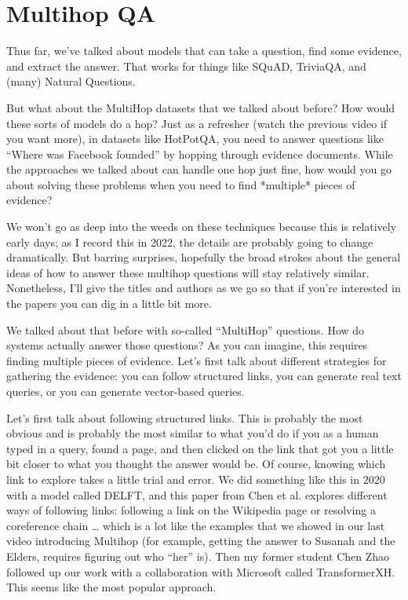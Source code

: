 \label{chapter:formats}


\section{Multihop QA}
\label{sec:formats:multihop}

Thus far, we’ve talked about models that can take a question, find some evidence, and extract the answer.  That works for things like SQuAD, TriviaQA, and (many) Natural Questions.  

But what about the MultiHop datasets that we talked about before?  How would these sorts of models do a hop?  Just as a refresher (watch the previous video if you want more), in datasets like HotPotQA, you need to answer questions like “Where was Facebook founded” by hopping through evidence documents.  While the approaches we talked about can handle one hop just fine, how would you go about solving these problems when you need to find *multiple* pieces of evidence?

We won’t go as deep into the weeds on these techniques because this is relatively early days; as I record this in 2022, the details are probably going to change dramatically.  But barring surprises, hopefully the broad strokes about the general ideas of how to answer these multihop questions will stay relatively similar.  Nonetheless, I’ll give the titles and authors as we go so that if you’re interested in the papers you can dig in a little bit more.

We talked about that before with so-called “MultiHop” questions.  How do systems actually answer those questions?  As you can imagine, this requires finding multiple pieces of evidence.  Let’s first talk about different strategies for gathering the evidence: you can follow structured links, you can generate real text queries, or you can generate vector-based queries.

Let’s first talk about following structured links.  This is probably the most obvious and is probably the most similar to what you’d do if you as a human typed in a query, found a page, and then clicked on the link that got you a little bit closer to what you thought the answer would be.  Of course, knowing which link to explore takes a little trial and error.  We did something like this in 2020 with a model called DELFT, and this paper from Chen et al. explores different ways of following links: following a link on the Wikipedia page or resolving a coreference chain … which is a lot like the examples that we showed in our last video introducing Multihop (for example, getting the answer to Susanah and the Elders, requires figuring out who “her” is).  Then my former student Chen Zhao followed up our work with a collaboration with Microsoft called TransformerXH.  This seems like the most popular approach.

